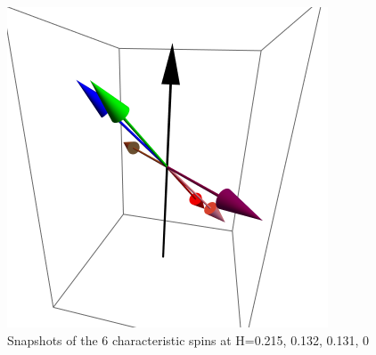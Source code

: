 \documentclass{article}
\begin{document}
\begin{figure}[ht]
\includegraphics[scale=0.37]{HVariedData/Pictures/010Dec216.png}
\caption{Snapshots of the 6 characteristic spins at H=0.215, 0.132, 0.131, 0}
\end{figure}
\end{document}
